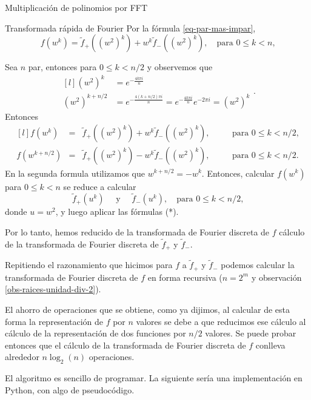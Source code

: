 \begin{chapter}{Multiplicación de polinomios por FFT}
\begin{section}{Transformada rápida de Fourier}
        Por  la fórmula \eqref{eq-par-mas-impar},
        $$
        f(w^k) = \tilde{f}_+((w^2)^k) + w^k \tilde{f}_-((w^2)^k), \quad \text{para $0 \le k < n$,}
        $$
        
        Sea $n$ par, entonces para $0 \le k <n/2$ y observemos que 
        \begin{equation*}
            \begin{matrix*}[l]
                (w^2)^k &= e^{-\frac{4k\pi i}{n}}   \\
                (w^2)^{k+ n/2} &= e^{-\frac{4(k+n/2)\pi i}{n}}= e^{-\frac{4k\pi i}{n}}e^{-2\pi i}= (w^2)^k
            \end{matrix*}. 
        \end{equation*}
        Entonces
        \begin{equation*}
            \begin{matrix*}[l]
                f(w^k) &=& \tilde{f}_+((w^2)^k) + w^k \tilde{f}_-((w^2)^k),& \quad &\text{para $0 \le k < n/2$,} \\
                f(w^{k+n/2}) &=& \tilde{f}_+((w^2)^k) - w^{k} \tilde{f}_-((w^2)^k),& \quad &\text{para $0 \le k < n/2$.}
            \end{matrix*} \tag{*}
        \end{equation*}
        En la segunda formula utilizamos que $w^{k + n/2}= -w^k$. Entonces, calcular $f(w^k)$ para $0 \le k < n$ se reduce a calcular 
        $$
        \tilde{f}_+(u^k) \quad\text{ y }\quad  \tilde{f}_-(u^k), \quad \text{para $0 \le k < n/2$,}
        $$
        donde $u= w^2$, y  luego  aplicar las fórmulas (*).
        
        Por lo tanto, hemos reducido de la transformada de Fourier discreta de $f$  cálculo de la transformada de Fourier discreta de $\tilde{f}_+$ y $\tilde{f}_-$.
        
        Repitiendo el razonamiento  que hicimos para $f$  a  $\tilde{f}_+$ y $\tilde{f}_-$ podemos calcular la transformada de Fourier discreta de $f$ en forma recursiva ($n = 2^m$ y observación \ref{obs-raices-unidad-div-2}).
        
        El ahorro de operaciones que se obtiene, como ya dijimos, al calcular de esta forma la representación de $f$ por $n$ valores se debe a que reducimos ese cálculo al cálculo de la representación de  dos funciones por $n/2$ valores. Se puede probar entonces que el cálculo de la transformada de Fourier discreta de $f$ conlleva alrededor $n\log_2(n)$ operaciones.

        El algoritmo es sencillo de programar. La siguiente sería una implementación en Python,  con algo de pseudocódigo.
    

\end{section}
\end{chapter}

